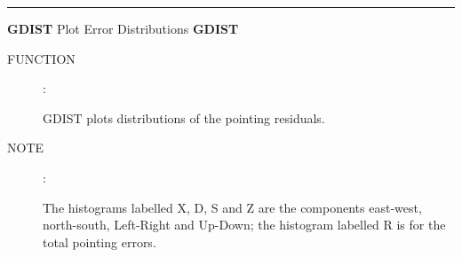 
\goodbreak
\rule{\textwidth}{0.3mm}
{\Large {\bf GDIST} \hfill Plot Error Distributions \hfill {\bf GDIST}}
\begin{description}
\item [FUNCTION]:

GDIST plots distributions of the pointing residuals.

\item [NOTE]:

The histograms labelled X, D, S and Z are the components east-west,
north-south, Left-Right and Up-Down; the histogram labelled R is
for the total pointing errors.

\end{description}


